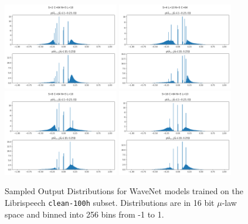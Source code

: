 \begin{figure}[ht]
    \centering
    \includegraphics[width=0.45\textwidth]{gfx/S2_N5_L10_C64_output_distribution_cut.png}
    \includegraphics[width=0.45\textwidth]{gfx/S4_N5_L10_C64_output_distribution_cut.png}
    \includegraphics[width=0.45\textwidth]{gfx/S8_N5_L10_C64_output_distribution_cut.png}
    \includegraphics[width=0.45\textwidth]{gfx/S16_N5_L10_C64_output_distribution_cut.png}
    \caption{
    Sampled Output Distributions for WaveNet models trained on the Librispeech \texttt{clean-100h} subset.
    Distributions are in 16 bit $\mu$-law space and binned into 256 bins from -1 to 1.
    }
    \label{fig:wavenet-output-distributions-cut}
\end{figure}

